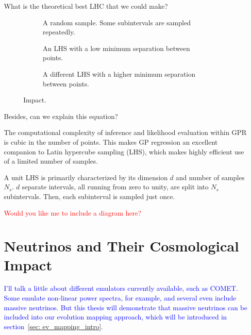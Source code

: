 What is the theoretical best LHC that we could make?

\begin{figure}[htb]
    \begin{subfigure}{0.32 \textwidth}
    \centering
 		
 		\caption{A random sample. Some subintervals are sampled repeatedly.}
 		\label{fig: random_sample}
    \end{subfigure}
    \begin{subfigure}{0.32 \textwidth}
    \centering
 		
 		\caption{An LHS with a low minimum separation between points.}
 		\label{fig: poor_lhs}
    \end{subfigure}
    \begin{subfigure}{0.32 \textwidth}
    \centering
 		
 		\caption{A different LHS with a higher minimum separation between
 			points.}
 		\label{fig: better_lhs}
    \end{subfigure}
    \centering
    \caption[Impact]{Impact.}
    \label{fig: this}
\end{figure}


Besides, can we explain this equation?

The computational
complexity of inference and likelihood evaluation within GPR is cubic
in the number of points. This makes GP regression an excellent companion to
Latin hypercube sampling (LHS), which makes highly efficient use of a limited 
number of samples.

A unit LHS is primarily characterized by its dimension $d$ and number of 
samples $N_s$. $d$ separate intervals, all running from zero to unity, are
split into $N_s$ subintervals. Then, each subinterval is sampled just once.


\textcolor{red}{Would you like me to include a diagram here?}

\section{Neutrinos and Their Cosmological Impact}
\label{sec: neutrino_problem}

\textcolor{blue}{I'll talk a little about different emulators currently 
available, such as 
COMET. Some emulate non-linear power spectra, for example, and several even 
include massive neutrinos. But this thesis will demonstrate that massive 
neutrinos can be included into our evolution mapping approach, which will be 
introduced in section~\ref{sec: ev_mapping_intro}.}

